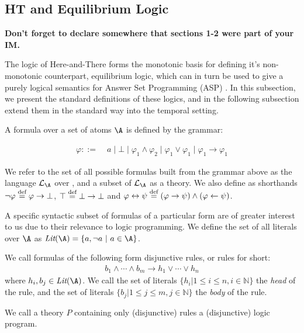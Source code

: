 \subsection{HT and Equilibrium Logic}

\textbf{Don't forget to declare somewhere that sections 1-2 were part
  of your IM.}

The logic of Here-and-There forms the monotonic basis for defining
it's non-monotonic counterpart, equilibrium logic, which can in turn
be used to give a purely logical semantics for Answer Set Programming
(ASP) \cite{pearce06a}. In this subsection, we present the standard
definitions of these logics, and in the following subsection extend
them in the standard way into the temporal setting.

A formula over a set of atoms $\A$ is defined by the grammar:

\begin{align*}
    \varphi ::= &\; a \mid \bot \mid
                  \varphi_1 \wedge \varphi_2 \mid
                  \varphi_1 \vee \varphi_1 \mid
                  \varphi_1 \to \varphi_1
\end{align*}

We refer to the set of all possible formulas built from the grammar above as the language $\mathcal{L}_\A$ over \A, and a subset of $\mathcal{L}_\A$ as a theory.
We also define as shorthands $\neg \varphi \stackrel{\text{def}}{=} \varphi \to \bot$, 
$\top \stackrel{\text{def}}{=} \bot \to \bot$ and $\varphi \leftrightarrow \psi \stackrel{\text{def}}{=} (\varphi \rightarrow \psi) \wedge (\varphi \leftarrow \psi)$.

A specific syntactic subset of formulas of a particular form are of
greater interest to us due to their relevance to logic programming.
We define the set of all literals over $\A$ as
$\textit{Lit}(\A) = \{ a, \lnot a\ |\ a \in \A \}$.

\begin{definition}
    We call formulas of the following form disjunctive rules, or rules for short:
\begin{align*}
  b_{1} \wedge \cdots \wedge b_{m} \rightarrow h_1 \vee \cdots \vee h_{n}
\end{align*}
where $h_{i}, b_{j} \in \textit{Lit}(\A)$. We call the set of literals $\{ h_i | 1 \leq i \leq n, i\in \mathbb{N}\}$ the \emph{head} of the rule, and the set of literals $\{ b_j | 1 \leq j \leq m, j \in \mathbb{N}\}$ the \emph{body} of the rule.
\end{definition}

We call a theory $P$ containing only (disjunctive) rules a
(disjunctive) logic program.

